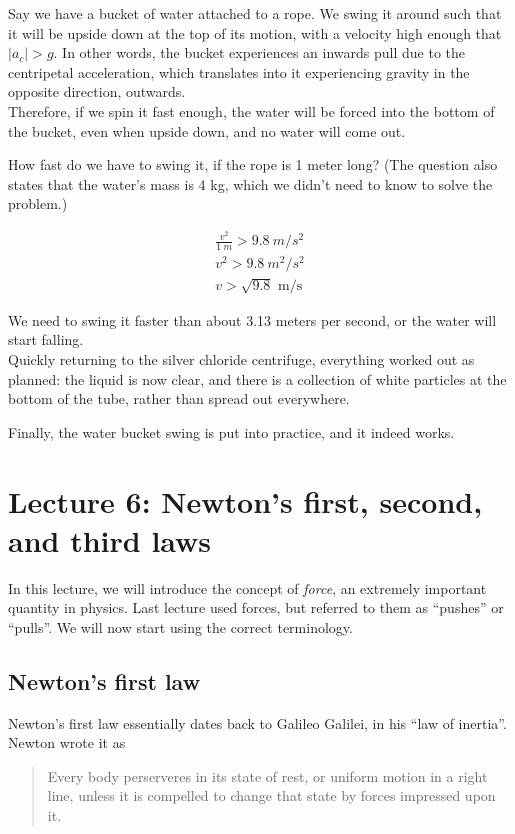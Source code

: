 \documentclass[12pt,a4paper]{report}
\begin{document}
Say we have a bucket of water attached to a rope. We swing it around such that it will be upside down at the top of its motion, with a velocity high enough that $|a_c| > g$. In other words, the bucket experiences an inwards pull due to the centripetal acceleration, which translates into it experiencing gravity in the opposite direction, outwards.\\
Therefore, if we spin it fast enough, the water will be forced into the bottom of the bucket, even when upside down, and no water will come out.

How fast do we have to swing it, if the rope is 1 meter long? (The question also states that the water's mass is 4 kg, which we didn't need to know to solve the problem.)

\begin{align}
\frac{v^2}{\SI{1}{m}} > \SI{9.8}{m/s^2}\\
v^2 > \SI{9.8}{m^2/s^2}\\
v > \sqrt{9.8} \text{ m/s}
\end{align}

We need to swing it faster than about 3.13 meters per second, or the water will start falling.\\
Quickly returning to the silver chloride centrifuge, everything worked out as planned: the liquid is now clear, and there is a collection of white particles at the bottom of the tube, rather than spread out everywhere.

Finally, the water bucket swing is put into practice, and it indeed works.

\section{Lecture 6: Newton's first, second, and third laws}

In this lecture, we will introduce the concept of \emph{force}, an extremely important quantity in physics. Last lecture used forces, but referred to them as ``pushes'' or ``pulls''. We will now start using the correct terminology.

\subsection{Newton's first law}

Newton's first law essentially dates back to Galileo Galilei, in his ``law of inertia''.\\
Newton wrote it as

\begin{quote}
Every body perserveres in its state of rest, or uniform motion in a right line, unless it is compelled to change that state by forces impressed upon it.
\end{quote}
\end{document}
